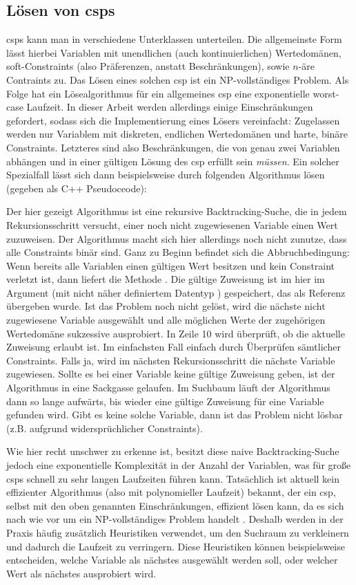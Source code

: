 \subsection{Lösen von \acp{csp}}
\acp{csp} kann man in verschiedene Unterklassen unterteilen. Die allgemeinste Form lässt hierbei Variablen mit unendlichen (auch kontinuierlichen) Wertedomänen, soft-Constraints
(also Präferenzen, anstatt Beschränkungen), sowie $n$-äre Contraints zu. Das Lösen eines solchen \ac*{csp} ist ein NP-vollständiges Problem. Als Folge hat ein Lösealgorithmus für
ein allgemeines \ac*{csp} eine exponentielle worst-case Laufzeit. In dieser Arbeit werden allerdings einige Einschränkungen gefordert, sodass sich die Implementierung eines Lösers
vereinfacht: Zugelassen werden nur Variablem mit diskreten, endlichen Wertedomänen und harte, binäre Constraints. Letzteres sind also Beschränkungen, die von genau zwei Variablen
abhängen und in einer gültigen Lösung des \ac*{csp} erfüllt sein \textit{müssen}. Ein solcher Spezialfall lässt sich dann beispielsweise durch folgenden Algorithmus lösen (gegeben
als C++ Pseudoceode):

Der hier gezeigt Algorithmus ist eine rekursive Backtracking-Suche, die in jedem Rekursionsschritt versucht, einer noch nicht zugewiesenen Variable einen Wert zuzuweisen. Der
Algorithmus macht sich hier allerdings noch nicht zunutze, dass alle Constraints binär sind. Ganz zu Beginn befindet sich die Abbruchbedingung: Wenn bereits alle Variablen einen
gültigen Wert besitzen und kein Constraint verletzt ist, dann liefert die Methode  . Die gültige Zuweisung ist im hier im Argument 
(mit nicht näher definiertem Datentyp ) gespeichert, das als Referenz übergeben wurde. Ist das Problem noch nicht gelöst, wird die nächste nicht zugewiesene Variable
ausgewählt und alle möglichen Werte der zugehörigen Wertedomäne sukzessive ausprobiert. In Zeile 10 wird überprüft, ob die aktuelle Zuweisung erlaubt ist. Im einfachsten Fall
einfach durch Überprüfen sämtlicher Constraints. Falls ja, wird im nächsten Rekursionsschritt die nächste Variable zugewiesen. Sollte es bei einer Variable keine gültige Zuweisung
geben, ist der Algorithmus in eine Sackgasse gelaufen. Im Suchbaum läuft der Algorithmus dann so lange aufwärts, bis wieder eine gültige Zuweisung für eine Variable gefunden wird.
Gibt es keine solche Variable, dann ist das Problem nicht lösbar (z.B. aufgrund  widersprüchlicher Constraints). 

Wie hier recht unschwer zu erkenne ist, besitzt diese naive Backtracking-Suche jedoch eine exponentielle Komplexität in der Anzahl der Variablen,
was für große \acp*{csp} schnell zu sehr langen Laufzeiten führen kann. Tatsächlich ist aktuell kein effizienter Algorithmus (also mit polynomieller Laufzeit) bekannt, der ein
\ac*{csp}, selbst mit den oben genannten Einschränkungen, effizient lösen kann, da es sich nach wie vor um ein NP-vollständiges Problem handelt \cite{BestCSPSearch}. Deshalb
werden in der Praxis häufig zusätzlich Heuristiken verwendet, um den Suchraum zu verkleinern und dadurch die Laufzeit zu verringern. Diese Heuristiken können beispielsweise
entscheiden, welche Variable als nächstes ausgewählt werden soll, oder welcher Wert als nächstes ausprobiert wird.


